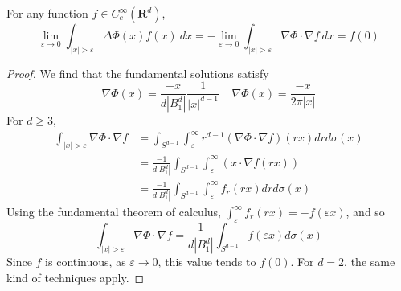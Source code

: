 \begin{theorem}
    For any function $f \in C_c^\infty(\mathbf{R}^d)$,
    \[ \lim_{\varepsilon \to 0} \int_{|x| > \varepsilon} \Delta \Phi(x) f(x)\ dx = - \lim_{\varepsilon \to 0} \int_{|x| > \varepsilon} \nabla \Phi \cdot \nabla f\ dx = f(0) \]
\end{theorem}
\begin{proof}
    We find that the fundamental solutions satisfy
    \[ \nabla \Phi(x) = \frac{-x}{d|B^d_1|} \frac{1}{|x|^{d-1}}\ \ \ \ \ \nabla \Phi(x) = \frac{-x}{2 \pi |x|} \]
    For $d \geq 3$,
    \begin{align*}
        \int_{|x| > \varepsilon} \nabla \Phi \cdot \nabla f &= \int_{S^{d-1}} \int_\varepsilon^\infty r^{d-1} (\nabla \Phi \cdot \nabla f)(rx) dr d\sigma(x)\\
        &= \frac{-1}{d |B_1^d| } \int_{S^{d-1}} \int_\varepsilon^\infty (x \cdot \nabla f(rx))\\
        &= \frac{-1}{d |B_1^d|} \int_{S^{d-1}} \int_\varepsilon^\infty f_r(rx) dr d\sigma(x)
    \end{align*}
    Using the fundamental theorem of calculus, $\int_\varepsilon^\infty f_r(rx) = -f(\varepsilon x)$, and so
    \[ \int_{|x| > \varepsilon} \nabla \Phi \cdot \nabla f = \frac{1}{d |B_1^d|} \int_{S^{d-1}} f(\varepsilon x) d\sigma(x) \]
    Since $f$ is continuous, as $\varepsilon \to 0$, this value tends to $f(0)$. For $d = 2$, the same kind of techniques apply.
\end{proof}


